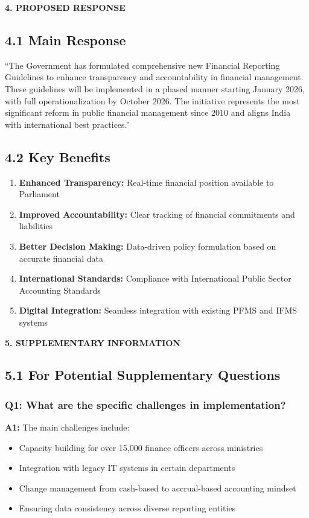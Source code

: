 \documentclass[12pt,a4paper]{article}
\newcommand{\sectionheader}[1]{\textbf{#1}}
\begin{document}
\vspace{0.5cm}

\sectionheader{4. PROPOSED RESPONSE}

\subsection*{4.1 Main Response}
``The Government has formulated comprehensive new Financial Reporting Guidelines to enhance transparency and accountability in financial management. These guidelines will be implemented in a phased manner starting January 2026, with full operationalization by October 2026. The initiative represents the most significant reform in public financial management since 2010 and aligns India with international best practices.''

\subsection*{4.2 Key Benefits}
\begin{enumerate}[leftmargin=*, itemsep=2pt]
    \item \textbf{Enhanced Transparency:} Real-time financial position available to Parliament
    \item \textbf{Improved Accountability:} Clear tracking of financial commitments and liabilities
    \item \textbf{Better Decision Making:} Data-driven policy formulation based on accurate financial data
    \item \textbf{International Standards:} Compliance with International Public Sector Accounting Standards
    \item \textbf{Digital Integration:} Seamless integration with existing PFMS and IFMS systems
\end{enumerate}

\vspace{0.5cm}

\sectionheader{5. SUPPLEMENTARY INFORMATION}

\subsection*{5.1 For Potential Supplementary Questions}

\subsubsection*{Q1: What are the specific challenges in implementation?}
\textbf{A1:} The main challenges include:
\begin{itemize}[leftmargin=*, itemsep=2pt]
    \item Capacity building for over 15,000 finance officers across ministries
    \item Integration with legacy IT systems in certain departments
    \item Change management from cash-based to accrual-based accounting mindset
    \item Ensuring data consistency across diverse reporting entities
\end{itemize}
\end{document}
